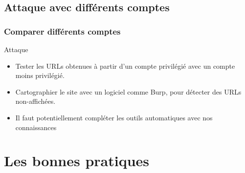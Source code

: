 \documentclass[aspectratio=169]{beamer}  %
\begin{document}
\subsection{Attaque avec différents comptes}

\begin{frame}
  \frametitle{Comparer différents comptes}
  \begin{alertblock}{Attaque}
    \begin{itemize}
      \item Tester les URLs obtenues à partir d'un compte privilégié avec un compte moins privilégié.
      \item Cartographier le site avec un logiciel comme Burp, pour détecter des URLs non-affichées.
      \item Il faut potentiellement compléter les outils automatiques avec nos connaissances
    \end{itemize}
  \end{alertblock}
\end{frame}


\section{Les bonnes pratiques}
\end{document}
